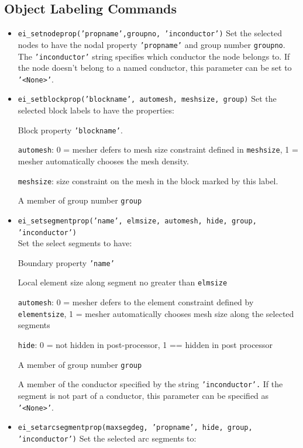 \subsection{Object Labeling Commands}

\begin{itemize}
\item {\tt ei\_setnodeprop('propname',groupno, 'inconductor')} Set the selected
nodes to have the nodal property \texttt{'propname'} and group
number \texttt{groupno}. The \texttt{'inconductor'} string
specifies which conductor the node belongs to. If the node doesn't
belong to a named conductor, this parameter can be set to
\texttt{'<None>'}.

\item {\tt ei\_setblockprop('blockname', automesh, meshsize, group)} Set the
selected block labels to have the properties:

Block property \texttt{'blockname'}.

\texttt{automesh}: 0 = mesher defers to mesh size constraint defined in
\texttt{meshsize}, 1 = mesher automatically chooses the mesh density.

\texttt{meshsize}: size constraint on the mesh in the block marked by this
label.

A member of group number \texttt{group}

\item {\tt ei\_setsegmentprop('name', elmsize, automesh, hide, group,
'inconductor')}\\ Set the select segments to have:

Boundary property \texttt{'name'}

Local element size along segment no greater than
\texttt{elmsize}

\texttt{automesh}: 0 = mesher defers to the element constraint defined by
\texttt{elementsize}, 1 = mesher automatically chooses mesh size along the
selected segments

\texttt{hide}: 0 = not hidden in post-processor, 1 == hidden in post
processor

A member of group number \texttt{group}

A member of the conductor specified by the string
\texttt{'inconductor'.} If the segment is not part of a conductor,
this parameter can be specified as
\texttt{'<None>'}.

\item {\tt ei\_setarcsegmentprop(maxsegdeg, 'propname', hide, group,
'inconductor')} Set the selected arc segments to:


\end{itemize}
